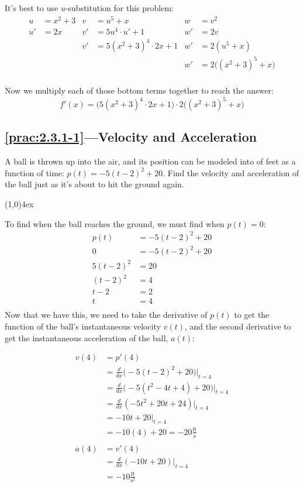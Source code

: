 \documentclass{MathNotes}
\newcommand{\br}{
\begin{center}
\line(1,0){4ex}
\end{center}}
\begin{document}
It's best to use $u$-substitution for this problem:
\begin{align*}
    u&=x^2+3 & v&=u^5+x & w&=v^2\\
    u'&=2x & v'&=5u^4\cdot u'+1 & w'&=2v\\
     && v'&=5(x^2+3)^4\cdot 2x+1 & w'&=2(u^5+x)\\
     && && w'&=2\big((x^2+3)^5+x\big)\\
\end{align*}

Now we multiply each of those bottom terms together to reach the answer:
$$f'(x)=\big(5(x^2+3)^4\cdot 2x+1\big)\cdot2\big((x^2+3)^5+x\big)$$

\newpage
\subsection*{\ref{prac:2.3.1-1}---Velocity and Acceleration}\label{ans:2.3.1-1}
A ball is thrown up into the air, and its position can be modeled into
of feet as a function of time: $p(t)=-5(t-2)^2+20$. Find the velocity and
acceleration of the ball just as it's about to hit the ground again.
\br
To find when the ball reaches the ground, we must find when $p(t)=0$:
\begin{align*}
    p(t)&=-5(t-2)^2+20\\
       0&=-5(t-2)^2+20\\
    5(t-2)^2&=20\\
    (t-2)^2&=4\\
    t-2&=2\\
    t&=4\\
\end{align*}
Now that we have this, we need to take the derivative of $p(t)$ to get the
function of the ball's instantaneous velocity $v(t)$, and the second derivative
to get the instantaneous acceleration of the ball, $a(t)$:

\begin{align*}
    v(4)&=p'(4)\\
    &=\frac{d}{dx}\big(-5(t-2)^2+20\big)\Big|_{t=4}\\
    &=\frac{d}{dx}\big(-5(t^2-4t+4)+20\big)\Big|_{t=4}\\
    &=\frac{d}{dx}(-5t^2+20t+24)\Big|_{t=4}\\
    &=-10t+20\Big|_{t=4}\\
    &=-10(4)+20=-20\frac{\text{ft}}{\text{s}}\\
    \\
    a(4)&=v'(4)\\
    &=\frac{d}{dx}(-10t+20)\Big|_{t=4}\\
    &=-10\frac{\text{ft}}{\text{s}^2}
\end{align*}
\end{document}
